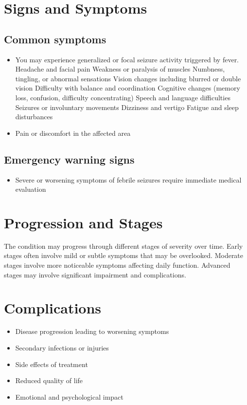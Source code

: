 \section{Signs and Symptoms}

\subsection{Common symptoms}
\begin{itemize}[noitemsep]
  \item You may experience generalized or focal seizure activity triggered by fever. Headache and facial pain Weakness or paralysis of muscles Numbness, tingling, or abnormal sensations Vision changes including blurred or double vision Difficulty with balance and coordination Cognitive changes (memory loss, confusion, difficulty concentrating) Speech and language difficulties Seizures or involuntary movements Dizziness and vertigo Fatigue and sleep disturbances
  \item Pain or discomfort in the affected area
  \end{itemize}

\subsection{Emergency warning signs}
\begin{itemize}[noitemsep]
  \item Severe or worsening symptoms of febrile seizures require immediate medical evaluation
\end{itemize}
\section{Progression and Stages}
The condition may progress through different stages of severity over time. Early stages often involve mild or subtle symptoms that may be overlooked. Moderate stages involve more noticeable symptoms affecting daily function. Advanced stages may involve significant impairment and complications.
\section{Complications}
\begin{itemize}[noitemsep]
  \item Disease progression leading to worsening symptoms
  \item Secondary infections or injuries
  \item Side effects of treatment
  \item Reduced quality of life
  \item Emotional and psychological impact
\end{itemize}
